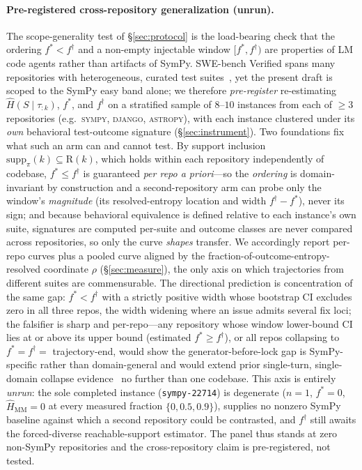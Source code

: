 \documentclass[11pt]{article}
\newcommand{\strat}{S}
\newcommand{\prefix}{\tau_{:k}}
\begin{document}
\paragraph{Pre-registered cross-repository generalization (unrun).}
The scope-generality test of \S\ref{sec:protocol} is the load-bearing check that the
ordering $f^\ast<f^\dagger$ and a non-empty injectable window $[f^\ast,f^\dagger)$ are
properties of LM code agents rather than artifacts of SymPy. SWE-bench Verified
spans many repositories with heterogeneous, curated test
suites~\citep{jimenez2024swebench}, yet the present draft is scoped to the SymPy
easy band alone; we therefore \emph{pre-register} re-estimating
$\widehat H(\strat\mid\prefix)$, $f^\ast$, and $f^\dagger$ on a stratified sample of
$8$--$10$ instances from each of $\geq\!3$ repositories (e.g.\ \textsc{sympy},
\textsc{django}, \textsc{astropy}), with each instance clustered under its \emph{own}
behavioral test-outcome signature (\S\ref{sec:instrument}). Two foundations fix what
such an arm can and cannot test. By support inclusion
$\mathrm{supp}_\pi(k)\subseteq\mathrm{R}(k)$, which holds within each repository
independently of codebase, $f^\ast\le f^\dagger$ is guaranteed \emph{per repo a
priori}---so the \emph{ordering} is domain-invariant by construction and a
second-repository arm can probe only the window's \emph{magnitude} (its
resolved-entropy location and width $f^\dagger-f^\ast$), never its sign; and because
behavioral equivalence is defined relative to each instance's own suite, signatures
are computed per-suite and outcome classes are never compared across repositories,
so only the curve \emph{shapes} transfer. We accordingly report per-repo curves
plus a pooled curve aligned by the fraction-of-outcome-entropy-resolved coordinate
$\rho$ (\S\ref{sec:measure}), the only axis on which trajectories from different
suites are commensurable. The directional prediction is concentration of the same
gap: $f^\ast<f^\dagger$ with a strictly positive width whose bootstrap CI excludes
zero in all three repos, the width widening where an issue admits several fix loci;
the falsifier is sharp and per-repo---any repository whose window lower-bound CI
lies at or above its upper bound (estimated $f^\ast\ge f^\dagger$), or all repos
collapsing to $f^\ast=f^\dagger=$ trajectory-end, would show the generator-before-lock
gap is SymPy-specific rather than domain-general and would extend prior single-turn,
single-domain collapse evidence~\citep{bigelow2024forking,egb2025,catts2026} no
further than one codebase. This axis is entirely \emph{unrun}: the sole completed
instance (\texttt{sympy-22714}) is degenerate ($n\!=\!1$, $f^\ast=0$,
$\widehat{H}_{\mathrm{MM}}=0$ at every measured fraction $\{0,0.5,0.9\}$), supplies no
nonzero SymPy baseline against which a second repository could be contrasted, and
$f^\dagger$ still awaits the forced-diverse reachable-support estimator. The panel
thus stands at zero non-SymPy repositories and the cross-repository claim is
pre-registered, not tested.
\end{document}
